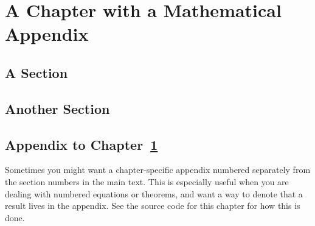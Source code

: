 \chapter{A Chapter with a Mathematical Appendix}
\label{cha:has-app}

\Blindtext[1]

\section{A Section}

\Blindtext[1]

\section{Another Section}

\Blindtext[1]


\setcounter{section}{0}
\let\oldthesection\thesection
\renewcommand{\thesection}{\thechapter.\Alph{section}}
\section{Appendix to Chapter~\ref{cha:has-app}}

Sometimes you might want a chapter-specific appendix numbered separately from
the section numbers in the main text.
This is especially useful when you are dealing with numbered equations or
theorems, and want a way to denote that a result lives in the appendix.
See the source code for this chapter for how this is done.

\let\thesection\oldthesection

